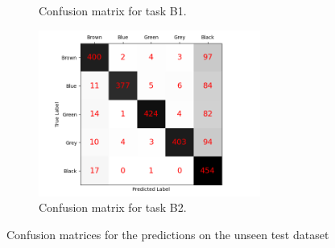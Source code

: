 \documentclass{article}
\begin{document}
\begin{figure}[H]
\begin{subfigure}{0.5\textwidth}
			\caption{Confusion matrix for task B1.}
			\label{fig:b1_confusion_matrix}	
		\end{subfigure}
		\begin{subfigure}{0.5\textwidth}
			\centering
			\includegraphics[width=0.8\textwidth]{b2_confusion_matrix.png}
			\caption{Confusion matrix for task B2.}
			\label{fig:b2_confusion_matrix}	
		\end{subfigure}
		\caption{Confusion matrices for the predictions on the unseen test dataset}
		\label{fig:confusion matrices}
	\end{figure}
	
\end{document}
